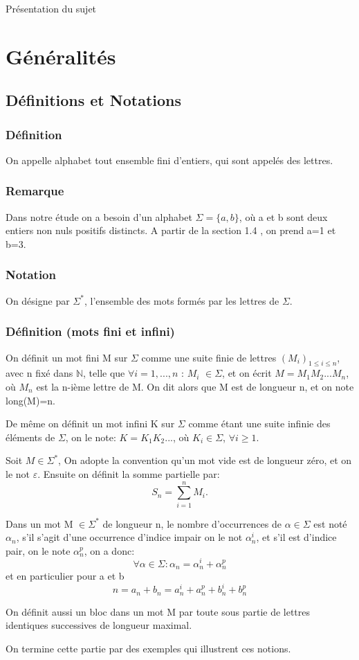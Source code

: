 \documentclass[12pt,a4paper,oneside]{book}
\begin{document}
\begin{titlepage}
\begin{chapter}{Présentation du sujet}
\section{Généralités}
\subsection{Définitions et Notations}
\subsubsection*{Définition}
On appelle alphabet tout ensemble fini d'entiers, qui sont appelés des lettres.
\subsubsection*{Remarque}
Dans notre étude on a besoin d'un alphabet \(\Sigma=\{a,b\}\), où a et b sont deux entiers non nuls positifs distincts. A partir de la section 1.4 , on prend a=1 et b=3.
\subsubsection*{Notation}
On désigne par  \(\Sigma^*\), l'ensemble des mots formés par les lettres de $\Sigma$. 
\subsubsection*{Définition (mots fini et infini)}
On définit un mot fini M sur $\Sigma$ comme une suite finie de lettres $(M_i)_{1\leq i\leq n}$, avec n fixé dans $ \mathbb{N}$, telle que $\forall i=1,...,n$ : $M_i$ $\in\Sigma$, et on écrit $M=M_1M_2...M_n$, où $M_n$ est la n-ième lettre de M. On dit alors que M est de longueur n, et on note long(M)=n.
\par De m\^eme on définit un mot infini K sur $\Sigma$ comme étant une suite infinie des éléments de $\Sigma$, on le note: $K=K_1K_2...$, où $K_i \in \Sigma$, $\forall i\geq 1.$\\
\par Soit $M \in \Sigma^*$, On adopte la convention qu'un mot vide est de longueur zéro, et on le not $\varepsilon$. Ensuite on définit la somme partielle par: $$S_n=\sum_{i=1}^nM_i.$$
\par Dans un mot M $\in \Sigma^*$ de longueur n, le nombre d'occurrences de $\alpha \in \Sigma$ est noté $\alpha_n$, s'il s'agit d'une occurrence d'indice impair on le not $\alpha_n^i$, et s'il est d'indice pair, on le note $\alpha_n^p $, on a donc:
$$\forall \alpha \in \Sigma : \alpha_n = \alpha_n^i + \alpha_n^p$$ 
et en particulier pour a et b
$$n= a_n + b_n = a_n^i + a_n^p + b_n^i + b_n^p$$ 
\par On définit aussi un bloc dans un mot M par toute sous partie de lettres identiques successives de longueur maximal.\\
\par On termine cette partie par des exemples qui illustrent ces notions.

\end{chapter}
\end{titlepage}
\end{document}
